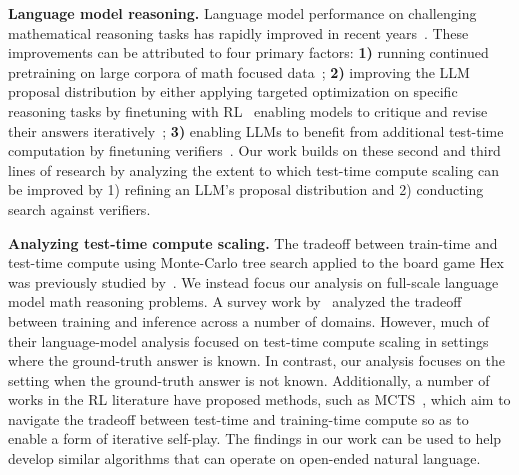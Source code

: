 \documentclass[11pt, letterpaper, logo]{googledeepmind}
\begin{document}
\textbf{Language model reasoning.} Language model performance on challenging mathematical reasoning tasks has rapidly improved in recent years~\citep{lewkowycz2022solving,geminiteam2024gemini,openai2024gpt4,shao2024deepseekmath,lightman2023lets}.
These improvements can be attributed to four primary factors: \textbf{1)} running continued pretraining on large corpora of math focused data~\citep{lewkowycz2022solving,geminiteam2024gemini,shao2024deepseekmath,lightman2023lets}; \textbf{2)} improving the LLM proposal distribution by either applying targeted optimization on specific reasoning tasks by finetuning with RL~\citep{singh2024human,zelikman2022star,shao2024deepseekmath,yuan2023scaling} enabling models to critique and revise their answers iteratively~\citep{bai2022constitutional,madaan2023selfrefine,du2023improving,saunders2022selfcritiquing}; \textbf{3)} enabling LLMs to benefit from additional test-time computation by finetuning verifiers~\citep{lightman2023lets,cobbe2021training,uesato2022solving,wang2023mathshepherd,yao2023tree,feng2024alphazerolike,chen2024alphamath,tian2024selfimprovement}.
Our work builds on these second and third lines of research by analyzing the extent to which test-time compute scaling can be improved by 1) refining an LLM's proposal distribution and 2) conducting search against verifiers.

\textbf{Analyzing test-time compute scaling.} The tradeoff between train-time and test-time compute using Monte-Carlo tree search applied to the board game Hex was previously studied by~\citet{jones2021scalingscalinglawsboard}. We instead focus our analysis on full-scale language model math reasoning problems. A survey work by~\citet{epoch2023tradingoffcomputeintrainingandinference} analyzed the tradeoff between training and inference across a number of domains. However, much of their language-model analysis focused on test-time compute scaling in settings where the ground-truth answer is known. In contrast, our analysis focuses on the setting when the ground-truth answer is not known. Additionally, a number of works in the RL literature have proposed methods, such as MCTS~\citep{kocsis2006bandit}, which aim to navigate the tradeoff between test-time and training-time compute so as to enable a form of iterative self-play. The findings in our work can be used to help develop similar algorithms that can operate on open-ended natural language.
\end{document}
